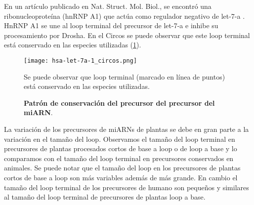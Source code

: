 En un artículo publicado en Nat. Struct. Mol. Biol., se encontró una ribonucleoproteína (hnRNP A1) que actúa como regulador negativo de let-7-a \citep{pmid20639884}.
HnRNP A1 se une al loop terminal del precursor de let-7-a e inhibe su procesamiento por Drosha.
En el Circos se puede observar que este loop terminal está conservado en las especies utilizadas (\ref{fig:hsa-let-7a-1_circos}).

\begin{figure}[htbp!] 
	\centering    
	\texttt{[image: hsa-let-7a-1\_circos.png]}
	\caption[Patrón de conservación del precursor del precursor del miARN hsa-let-7a-1]{
		\textbf{Patrón de conservación del precursor del precursor del miARN}.
	}
	\label{fig:hsa-let-7a-1_circos}
    Se puede observar que loop terminal (marcado en línea de puntos) está conservado en las especies utilizadas.
\end{figure}

La variación de los precursores de miARNs de plantas se debe en gran parte a la variación en el tamaño del loop.
Observamos el tamaño del loop terminal en precursores de plantas procesados cortos de base a loop o de loop a base y lo comparamos con el tamaño del loop terminal en precursores conservados en animales.
Se puede notar que el tamaño del loop en los precursores de plantas cortos de base a loop son más variables además de más grande.
En cambio el tamaño del loop terminal de los precursores de humano son pequeños y similares al tamaño del loop terminal de precursores de plantas loop a base.


